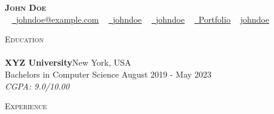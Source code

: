 \documentclass[a4paper,10.85pt]{article}
\newcommand{\lineunder} {
    \vspace*{-8pt} \\
    \hspace*{-18pt} \hrulefill \\
}
\newcommand{\header} [1] {
    {\hspace*{-18pt}\vspace*{6pt} \textsc{#1}}
    \vspace*{-6pt} \lineunder
}
\begin{document}
\vspace*{-30pt}

\begin{center}
{\Huge \scshape \textbf {John Doe}}\\
\vspace*{1pt}
~ \href{mailto:johndoe@example.com}{\raisebox{-0.2\height}\faEnvelope\  \underline{johndoe@example.com}} ~ 
\href{https://www.linkedin.com/in/johndoe/}{\raisebox{-0.2\height}\faLinkedin\ \underline{johndoe}}  ~
\href{https://github.com/johndoe}{\raisebox{-0.2\height}\faGithub\ \underline{johndoe}} ~ 
\href{https://portfolio.johndoe.com}{\raisebox{-0.2\height}\faGlobe\ \underline{Portfolio}}  ~
\href{https://leetcode.com/johndoe/}{ \underline{johndoe}}
\vspace{-5pt}
\end{center}

\header{Education}
\vspace{2mm}
\textbf{XYZ University}\hfill New York, USA\\
Bachelors in Computer Science \hfill August 2019 - May 2023\\
{\sl CGPA: 9.0/10.00}\\
\vspace{1.5mm}

\header{Experience}
\vspace{2mm}
\end{document}
